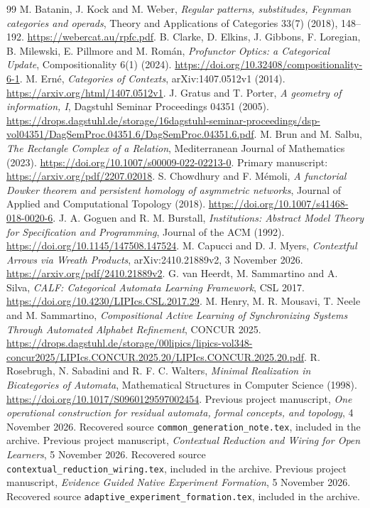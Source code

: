 \documentclass[11pt]{article}
\theoremstyle{definition}\newtheorem{definition}[theorem]{Definition}
\theoremstyle{remark}\newtheorem{remark}[theorem]{Remark}
\begin{document}
\begin{thebibliography}{99}
 M. Batanin, J. Kock and M. Weber,
\emph{Regular patterns, substitudes, Feynman categories and operads},
Theory and Applications of Categories 33(7) (2018), 148--192.
\url{https://webercat.au/rpfc.pdf}.
 B. Clarke, D. Elkins, J. Gibbons, F. Loregian,
B. Milewski, E. Pillmore and M. Rom\'an,
\emph{Profunctor Optics: a Categorical Update}, Compositionality 6(1) (2024).
\url{https://doi.org/10.32408/compositionality-6-1}.
 M. Ern\'e, \emph{Categories of Contexts},
arXiv:1407.0512v1 (2014).
\url{https://arxiv.org/html/1407.0512v1}.
 J. Gratus and T. Porter, \emph{A geometry of information, I},
Dagstuhl Seminar Proceedings 04351 (2005).
\url{https://drops.dagstuhl.de/storage/16dagstuhl-seminar-proceedings/dsp-vol04351/DagSemProc.04351.6/DagSemProc.04351.6.pdf}.
 M. Brun and M. Salbu, \emph{The Rectangle Complex of a Relation},
Mediterranean Journal of Mathematics (2023).
\url{https://doi.org/10.1007/s00009-022-02213-0}.
Primary manuscript: \url{https://arxiv.org/pdf/2207.02018}.
 S. Chowdhury and F. M\'emoli,
\emph{A functorial Dowker theorem and persistent homology of asymmetric networks},
Journal of Applied and Computational Topology (2018).
\url{https://doi.org/10.1007/s41468-018-0020-6}.
 J. A. Goguen and R. M. Burstall,
\emph{Institutions: Abstract Model Theory for Specification and Programming},
Journal of the ACM (1992).
\url{https://doi.org/10.1145/147508.147524}.
 M. Capucci and D. J. Myers,
\emph{Contextful Arrows via Wreath Products}, arXiv:2410.21889v2,
3 November 2026.
\url{https://arxiv.org/pdf/2410.21889v2}.
 G. van Heerdt, M. Sammartino and A. Silva,
\emph{CALF: Categorical Automata Learning Framework}, CSL 2017.
\url{https://doi.org/10.4230/LIPIcs.CSL.2017.29}.
 M. Henry, M. R. Mousavi, T. Neele and M. Sammartino,
\emph{Compositional Active Learning of Synchronizing Systems Through
Automated Alphabet Refinement}, CONCUR 2025.
\url{https://drops.dagstuhl.de/storage/00lipics/lipics-vol348-concur2025/LIPIcs.CONCUR.2025.20/LIPIcs.CONCUR.2025.20.pdf}.
 R. Rosebrugh, N. Sabadini and R. F. C. Walters,
\emph{Minimal Realization in Bicategories of Automata},
Mathematical Structures in Computer Science (1998).
\url{https://doi.org/10.1017/S0960129597002454}.
 Previous project manuscript,
\emph{One operational construction for residual automata, formal concepts,
and topology}, 4 November 2026.
Recovered source \texttt{common\_generation\_note.tex}, included in the archive.
 Previous project manuscript,
\emph{Contextual Reduction and Wiring for Open Learners}, 5 November 2026.
Recovered source \texttt{contextual\_reduction\_wiring.tex}, included in the archive.
 Previous project manuscript,
\emph{Evidence Guided Native Experiment Formation}, 5 November 2026.
Recovered source \texttt{adaptive\_experiment\_formation.tex}, included in the archive.
\end{thebibliography}
\end{document}
